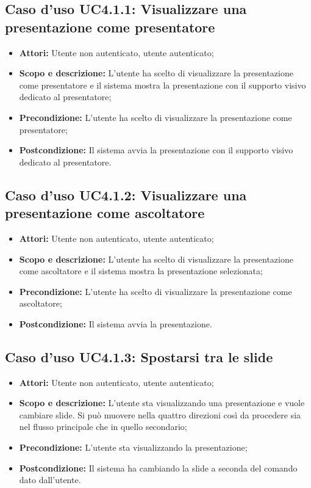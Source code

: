 \subsection{Caso d'uso UC4.1.1: Visualizzare una presentazione come presentatore}
\begin{itemize}
	\item \textbf{Attori:} Utente non autenticato, utente autenticato;
	\item \textbf{Scopo e descrizione:} L'utente ha scelto di visualizzare la presentazione come presentatore e il sistema mostra la presentazione con il supporto visivo dedicato al presentatore;
	\item \textbf{Precondizione:} L'utente ha scelto di visualizzare la presentazione come presentatore;
	\item \textbf{Postcondizione:} Il sistema avvia la presentazione con il supporto visivo dedicato al presentatore.
\end{itemize}

\subsection{Caso d'uso UC4.1.2: Visualizzare una presentazione come ascoltatore}
\begin{itemize}
	\item \textbf{Attori:} Utente non autenticato, utente autenticato;
	\item \textbf{Scopo e descrizione:} L'utente ha scelto di visualizzare la presentazione come ascoltatore e il sistema mostra la presentazione selezionata;
	\item \textbf{Precondizione:} L'utente ha scelto di visualizzare la presentazione come ascoltatore;
	\item \textbf{Postcondizione:} Il sistema avvia la presentazione.
\end{itemize}

\subsection{Caso d'uso UC4.1.3: Spostarsi tra le slide}
\begin{itemize}
	\item \textbf{Attori:} Utente non autenticato, utente autenticato;
	\item \textbf{Scopo e descrizione:} L'utente sta visualizzando una presentazione e vuole cambiare \gls{slide}. Si può muovere nella quattro direzioni così da procedere sia nel flusso principale che in quello secondario;
	\item \textbf{Precondizione:} L'utente sta visualizzando la presentazione;
	\item \textbf{Postcondizione:} Il sistema ha cambiando la \gls{slide} a seconda del comando dato dall'utente.
\end{itemize}


